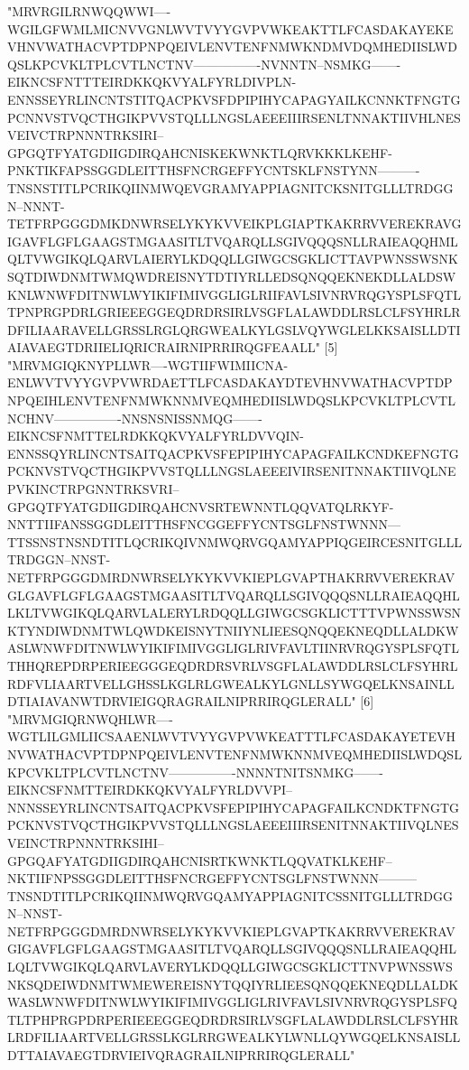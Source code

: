 \documentclass[11pt]{article}
\begin{document}
\begin{Schunk}
\begin{Soutput}
[4] "MRVRGILRNWQQWWI----WGILGFWMLMICNVVGNLWVTVYYGVPVWKEAKTTLFCASDAKAYEKEVHNVWATHACVPTDPNPQEIVLENVTENFNMWKNDMVDQMHEDIISLWDQSLKPCVKLTPLCVTLNCTNV----------------NVNNTN--NSMKG-------EIKNCSFNTTTEIRDKKQKVYALFYRLDIVPLN-ENNSSEYRLINCNTSTITQACPKVSFDPIPIHYCAPAGYAILKCNNKTFNGTGPCNNVSTVQCTHGIKPVVSTQLLLNGSLAEEEIIIRSENLTNNAKTIIVHLNESVEIVCTRPNNNTRKSIRI--GPGQTFYATGDIIGDIRQAHCNISKEKWNKTLQRVKKKLKEHF-PNKTIKFAPSSGGDLEITTHSFNCRGEFFYCNTSKLFNSTYNN----------TNSNSTITLPCRIKQIINMWQEVGRAMYAPPIAGNITCKSNITGLLLTRDGGN--NNNT-TETFRPGGGDMKDNWRSELYKYKVVEIKPLGIAPTKAKRRVVEREKRAVGIGAVFLGFLGAAGSTMGAASITLTVQARQLLSGIVQQQSNLLRAIEAQQHMLQLTVWGIKQLQARVLAIERYLKDQQLLGIWGCSGKLICTTAVPWNSSWSNKSQTDIWDNMTWMQWDREISNYTDTIYRLLEDSQNQQEKNEKDLLALDSWKNLWNWFDITNWLWYIKIFIMIVGGLIGLRIIFAVLSIVNRVRQGYSPLSFQTLTPNPRGPDRLGRIEEEGGEQDRDRSIRLVSGFLALAWDDLRSLCLFSYHRLRDFILIAARAVELLGRSSLRGLQRGWEALKYLGSLVQYWGLELKKSAISLLDTIAIAVAEGTDRIIELIQRICRAIRNIPRRIRQGFEAALL"
[5] "MRVMGIQKNYPLLWR----WGTIIFWIMIICNA-ENLWVTVYYGVPVWRDAETTLFCASDAKAYDTEVHNVWATHACVPTDPNPQEIHLENVTENFNMWKNNMVEQMHEDIISLWDQSLKPCVKLTPLCVTLNCHNV----------------NNSNSNISSNMQG-------EIKNCSFNMTTELRDKKQKVYALFYRLDVVQIN-ENNSSQYRLINCNTSAITQACPKVSFEPIPIHYCAPAGFAILKCNDKEFNGTGPCKNVSTVQCTHGIKPVVSTQLLLNGSLAEEEIVIRSENITNNAKTIIVQLNEPVKINCTRPGNNTRKSVRI--GPGQTFYATGDIIGDIRQAHCNVSRTEWNNTLQQVATQLRKYF-NNTTIIFANSSGGDLEITTHSFNCGGEFFYCNTSGLFNSTWNNN---TTSSNSTNSNDTITLQCRIKQIVNMWQRVGQAMYAPPIQGEIRCESNITGLLLTRDGGN--NNST-NETFRPGGGDMRDNWRSELYKYKVVKIEPLGVAPTHAKRRVVEREKRAVGLGAVFLGFLGAAGSTMGAASITLTVQARQLLSGIVQQQSNLLRAIEAQQHLLKLTVWGIKQLQARVLALERYLRDQQLLGIWGCSGKLICTTTVPWNSSWSNKTYNDIWDNMTWLQWDKEISNYTNIIYNLIEESQNQQEKNEQDLLALDKWASLWNWFDITNWLWYIKIFIMIVGGLIGLRIVFAVLTIINRVRQGYSPLSFQTLTHHQREPDRPERIEEGGGEQDRDRSVRLVSGFLALAWDDLRSLCLFSYHRLRDFVLIAARTVELLGHSSLKGLRLGWEALKYLGNLLSYWGQELKNSAINLLDTIAIAVANWTDRVIEIGQRAGRAILNIPRRIRQGLERALL"
[6] "MRVMGIQRNWQHLWR----WGTLILGMLIICSAAENLWVTVYYGVPVWKEATTTLFCASDAKAYETEVHNVWATHACVPTDPNPQEIVLENVTENFNMWKNNMVEQMHEDIISLWDQSLKPCVKLTPLCVTLNCTNV----------------NNNNTNITSNMKG-------EIKNCSFNMTTEIRDKKQKVYALFYRLDVVPI--NNNSSEYRLINCNTSAITQACPKVSFEPIPIHYCAPAGFAILKCNDKTFNGTGPCKNVSTVQCTHGIKPVVSTQLLLNGSLAEEEIIIRSENITNNAKTIIVQLNESVEINCTRPNNNTRKSIHI--GPGQAFYATGDIIGDIRQAHCNISRTKWNKTLQQVATKLKEHF--NKTIIFNPSSGGDLEITTHSFNCRGEFFYCNTSGLFNSTWNNN---------TNSNDTITLPCRIKQIINMWQRVGQAMYAPPIAGNITCSSNITGLLLTRDGGN--NNST-NETFRPGGGDMRDNWRSELYKYKVVKIEPLGVAPTKAKRRVVEREKRAVGIGAVFLGFLGAAGSTMGAASITLTVQARQLLSGIVQQQSNLLRAIEAQQHLLQLTVWGIKQLQARVLAVERYLKDQQLLGIWGCSGKLICTTNVPWNSSWSNKSQDEIWDNMTWMEWEREISNYTQQIYRLIEESQNQQEKNEQDLLALDKWASLWNWFDITNWLWYIKIFIMIVGGLIGLRIVFAVLSIVNRVRQGYSPLSFQTLTPHPRGPDRPERIEEEGGEQDRDRSIRLVSGFLALAWDDLRSLCLFSYHRLRDFILIAARTVELLGRSSLKGLRRGWEALKYLWNLLQYWGQELKNSAISLLDTTAIAVAEGTDRVIEIVQRAGRAILNIPRRIRQGLERALL"

\end{Soutput}
\end{Schunk}
\end{document}
